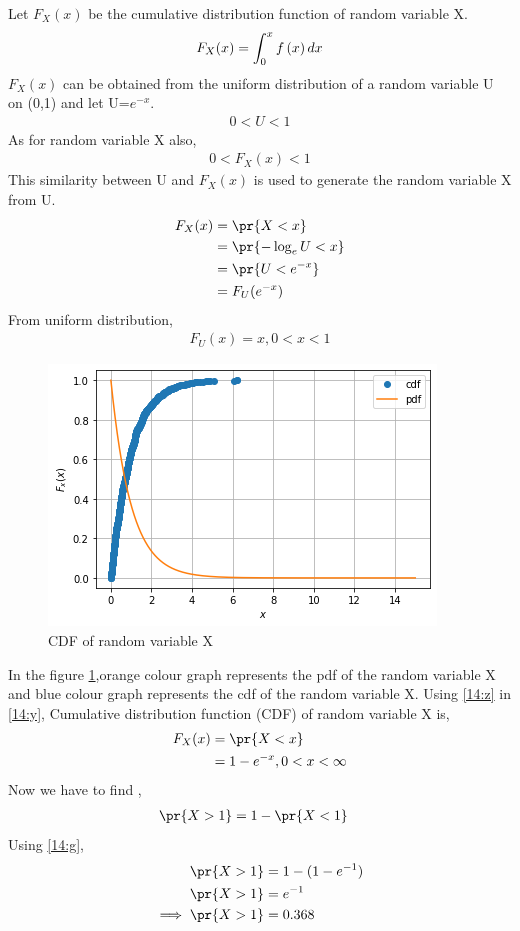 Let $F_X(x)$ be the cumulative distribution function of random variable X.
\begin{align}
    F_X(x)=\int_{0}^x f\left(x\right) dx\label{14:x}
\end{align}
$F_X(x)$ can be obtained from the uniform distribution of a random variable U on (0,1) and let U=$e^{-x}$. 
\begin{align}
    0 < U < 1
\end{align}
As for random variable X also,
\begin{align}
    0 < F_X(x) < 1
\end{align}
This similarity between U and $F_X(x)$ is used to generate the random variable X from U.
\begin{align}
    F_X(x)&=\pr{X<x}\\
    &=\pr{-\log_e U<x}\\
    &=\pr{U<e^{-x}}\\
    &=F_U(e^{-x})\label{14:y}
\end{align}
From uniform distribution,
\begin{align}
    F_U(x)= x ,0<x<1 \label{14:z}
\end{align}
\begin{figure}[htp]
    \centering
    \includegraphics[width=\columnwidth]{solutions/ec/14/FIGURES/Figure.png}
    \caption{CDF  of random variable X}
\label{14:fig:CDF}
\end{figure}
In the figure \ref{14:fig:CDF},orange colour graph represents the pdf of the random variable X and blue colour graph represents the cdf of the random variable X.
Using \eqref{14:z} in \eqref{14:y},
Cumulative distribution function (CDF) of random variable X is,
\begin{align}
F_X(x) &= \pr{X<x}\\
&= 1 -e^{-x} ,0<x<\infty \label{14:g}
\end{align}
Now we have to find ,
\begin{align}
    \pr{X>1} &= 1-\pr{X<1}
\end{align}
Using  \eqref{14:g},
\begin{align}
    \pr{X>1} &= 1-(1 -e^{-1})\\
    \pr{X>1} &= e^{-1}\\
   \implies \pr{X>1} &= 0.368 
\end{align}

%
